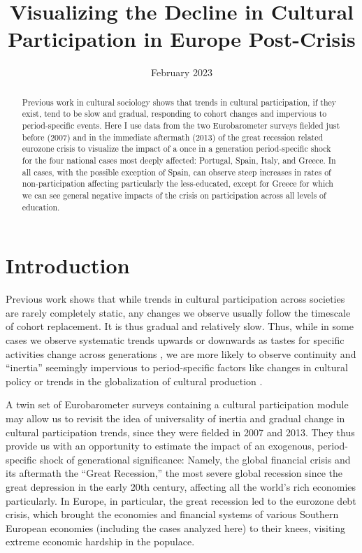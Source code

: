 \documentclass{article}
\title{Visualizing the Decline in Cultural Participation in Europe Post-Crisis}
\date{February 2023}
\begin{document}
\maketitle

\begin{abstract}
    Previous work in cultural sociology shows that trends in cultural participation, if they exist, tend to be slow and gradual, responding to cohort changes and impervious to period-specific events. Here I use data from the two Eurobarometer surveys fielded just before (2007) and in the immediate aftermath (2013) of the great recession related eurozone crisis to visualize the impact of a once in a generation period-specific shock for the four national cases most deeply affected: Portugal, Spain, Italy, and Greece. In all cases, with the possible exception of Spain, can observe steep increases in rates of non-participation affecting particularly the less-educated, except for Greece for which we can see general negative impacts of the crisis on participation across all levels of education. \end{abstract}

\section{Introduction}
Previous work shows that while trends in cultural participation across societies are rarely completely static, any changes we observe usually follow the timescale of cohort replacement. It is thus gradual and relatively slow. Thus, while in some cases we observe systematic trends upwards or downwards as tastes for specific activities change across generations \citep{dimaggio2004arts}, we are more likely to observe continuity and ``inertia'' seemingly impervious to period-specific factors like changes in cultural policy or trends in the globalization of cultural production \citep{coulangeon2013changing, lopez2005exclusive}.

A twin set of Eurobarometer surveys containing a cultural participation module may allow us to revisit the idea of universality of inertia and gradual change in cultural participation trends, since they were fielded in 2007 and 2013. They thus provide us with an opportunity to estimate the impact of an exogenous, period-specific shock of generational significance: Namely, the global financial crisis and its aftermath the ``Great Recession,'' the most severe global recession since the great depression in the early 20th century,  affecting all the world's rich economies particularly. In Europe, in particular, the great recession led to the eurozone debt crisis, which brought the economies and financial systems of various Southern European economies (including the cases analyzed here) to their knees, visiting extreme economic hardship in the populace.
\end{document}
